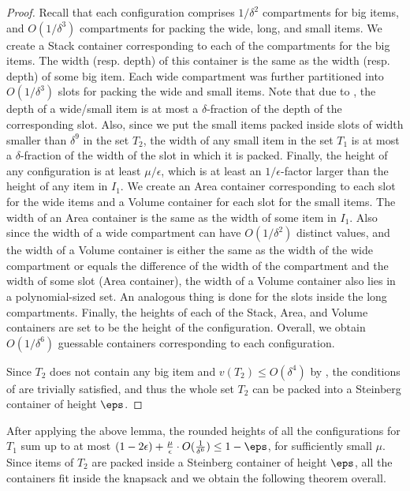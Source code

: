 \begin{proof}
Recall that each configuration comprises $1/\delta^2$ compartments for big items, and $O(1/\delta^3)$ compartments for packing the wide, long, and small items. We create a Stack container corresponding to each of the compartments for the big items. The width (resp. depth) of this container is the same as the width (resp. depth) of some big item. Each wide compartment was further partitioned into $O(1/\delta^3)$ slots for packing the wide and small items. Note that due to , the depth of a wide/small item is at most a $\delta$-fraction of the depth of the corresponding slot. Also, since we put the small items packed inside slots of width smaller than $\delta^9$ in the set $T_2$, the width of any small item in the set $T_1$ is at most a $\delta$-fraction of the width of the slot in which it is packed. Finally, the height of any configuration is at least $\mu/\epsilon$, which is at least an $1/\epsilon$-factor larger than the height of any item in $I_1$. We create an Area container corresponding to each slot for the wide items and a Volume container for each slot for the small items. The width of an Area container is the same as the width of some item in $I_1$. Also since the width of a wide compartment can have  $O(1/\delta^2)$ distinct values, and the width of a Volume container is either the same as the width of the wide compartment or equals the difference of the width of the compartment and the width of some slot (Area container), the width of a Volume container also lies in a polynomial-sized set. An analogous thing is done for the slots inside the long compartments. Finally, the heights of each of the  Stack, Area, and Volume containers are set to be the height of the configuration. Overall, we obtain $O(1/\delta^6)$ guessable containers corresponding to each configuration.

Since $T_2$ does not contain any big item and $v(T_2)\le O(\delta^4)$ by , the conditions of  are trivially satisfied, and thus the whole set $T_2$ can be packed into a Steinberg container of height $\eps$.
\end{proof}






After applying the above lemma, the rounded heights of all the configurations for $T_1$ sum up to at most $(1-2\epsilon)+\frac{\mu}{\epsilon}\cdot O(\frac{1}{\delta^{6}}) \le 1-\eps$, for sufficiently small $\mu$. Since items of $T_2$ are packed inside a Steinberg container of height $\eps$, all the containers fit inside the knapsack and we obtain the following theorem overall.





